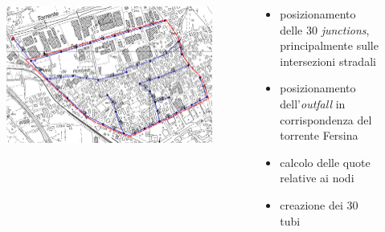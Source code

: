 \documentclass{beamer}
\begin{document}
\begin{frame}
\begin{columns}
\begin{column}{.5\textwidth}
\begin{figure}
\begin{overprint}
     \includegraphics[width=\linewidth]{images/conduits}
    \end{overprint}
   \end{figure}
  \end{column}
  
  \begin{column}{.5\textwidth}
   \begin{itemize}[<+->]
    \item posizionamento delle $30$ \emph{junctions}, principalmente sulle intersezioni stradali
    \item posizionamento dell'\emph{outfall} in corrispondenza del torrente Fersina
     \item calcolo delle quote relative ai nodi
     \item creazione dei 30 tubi
   \end{itemize}
  \end{column}
 \end{columns}
\end{frame}
\end{document}
